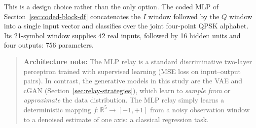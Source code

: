 \begin{enumerate}
This is a design choice rather than the only option. The coded MLP of Section~\ref{sec:coded-block-df} concatenates the $I$ window followed by the $Q$ window into a single input vector and classifies over the joint four-point QPSK alphabet. Its 21-symbol window supplies 42 real inputs, followed by 16 hidden units and four outputs: 756 parameters.

\begin{quote}
\textbf{Architecture note:} The MLP relay is a standard discriminative two-layer perceptron trained with supervised learning (MSE loss on input--output pairs). In contrast, the generative models in this study are the VAE and cGAN (Section~\ref{sec:relay-strategies}), which learn to \emph{sample from} or \emph{approximate} the data distribution. The MLP relay simply learns a deterministic mapping \(f: \mathbb{R}^5 \to [-1,+1]\) from a noisy observation window to a denoised estimate of one axis: a classical regression task.
\end{quote}


\end{enumerate}
